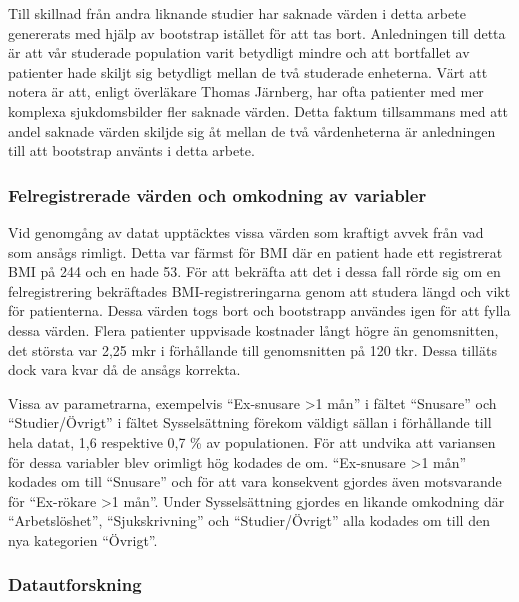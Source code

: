 Till skillnad från andra liknande studier har saknade värden i detta arbete genererats med hjälp av bootstrap istället för att tas bort. Anledningen till detta är att vår studerade population varit betydligt mindre och att bortfallet av patienter hade skiljt sig betydligt mellan de två studerade enheterna. Värt att notera är att, enligt överläkare Thomas Järnberg,  har ofta patienter med mer komplexa sjukdomsbilder fler saknade värden. Detta faktum tillsammans med att andel saknade värden skiljde sig åt mellan de två vårdenheterna är anledningen till att bootstrap använts i detta arbete.

\subsubsection{Felregistrerade värden och omkodning av variabler}
Vid genomgång av datat upptäcktes vissa värden som kraftigt avvek från vad som ansågs rimligt. Detta var färmst för BMI där en patient hade ett registrerat BMI på 244 och en hade 53. För att bekräfta att det i dessa fall rörde sig om en felregistrering bekräftades BMI-registreringarna genom att studera längd och vikt för patienterna. Dessa värden togs bort och bootstrapp användes igen för att fylla dessa värden. Flera patienter uppvisade kostnader långt högre än genomsnitten, det största var 2,25 mkr i förhållande till genomsnitten på 120 tkr. Dessa tilläts dock vara kvar då de ansågs korrekta.

Vissa av parametrarna, exempelvis “Ex-snusare \textgreater1 mån” i fältet “Snusare” och “Studier/Övrigt” i fältet Sysselsättning förekom väldigt sällan i förhållande till hela datat, 1,6 respektive 0,7 \% av populationen. För att undvika att variansen för dessa variabler blev orimligt hög kodades de om. “Ex-snusare \textgreater1 mån” kodades om till “Snusare” och för att vara konsekvent gjordes även motsvarande för “Ex-rökare \textgreater1 mån”. Under Sysselsättning gjordes en likande omkodning där “Arbetslöshet”, “Sjukskrivning” och “Studier/Övrigt” alla kodades om till den nya kategorien “Övrigt”.

\subsubsection{Datautforskning}

